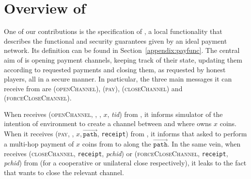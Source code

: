 \section{Overview of \fpaynet{}}
\label{sec:ov-paynet}
  One of our contributions is the specification of \fpaynet, a local functionality
  that describes the functional and security guarantees given by an ideal
  payment network. Its definition can be found in Section~\ref{appendix:payfunc}. The central aim of \fpaynet{} is opening payment
  channels, keeping track of their state, updating them according to requested
  payments and closing them, as requested by honest players, all in a secure
  manner. In particular, the three main messages it can receive from \alice{}
  are (\textsc{openChannel}), (\textsc{pay}), (\textsc{closeChannel}) and
  (\textsc{forceCloseChannel}).

  When \fpaynet{} receives (\textsc{openChannel}, \alice, \bob, $x$,
  \textit{tid}) from \alice, it informs simulator \simulator{} of the
  intention of environment \environment{} to create a channel between
  \alice{} and \bob{} where \alice{} owns $x$ coins. When it receives
  (\textsc{pay}, \bob, $x, \overrightarrow{\mathtt{path}}$, \texttt{receipt})
  from \alice, it informs \simulator{} that \environment{} asked to perform a
  multi-hop payment of $x$ coins from \alice{} to \bob{} along the
  $\overrightarrow{\mathtt{path}}$. In the same vein, when \fpaynet{}
  receives (\textsc{closeChannel}, \texttt{receipt}, \textit{pchid}) or
  (\textsc{forceCloseChannel}, \texttt{receipt}, \textit{pchid}) from
  \alice{} (for a cooperative or unilateral close respectively), it
  leaks to \simulator{} the fact that \environment{} wants to close the relevant
  channel.

